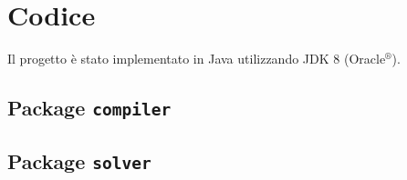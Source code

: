 \section{Codice}

Il progetto è stato implementato in Java\texttrademark{} utilizzando JDK 8 (Oracle$^{\text{®}}$).

\subsection{Package {\tt compiler}}






\subsection{Package {\tt solver}}








